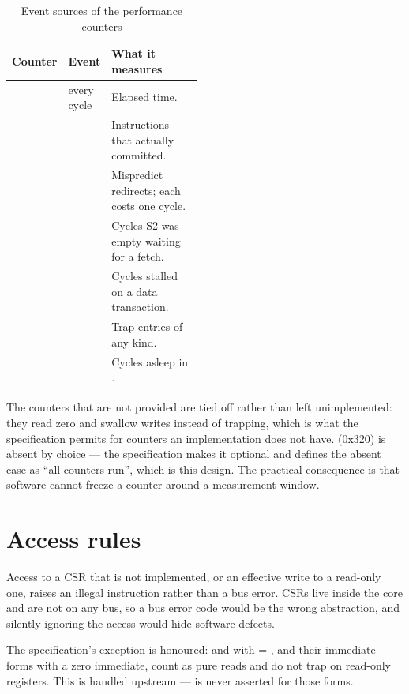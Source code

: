 \begin{table}[H]
\centering
\caption{Event sources of the performance counters}
\label{tab:hpm}
\begin{tabular}{@{}llL{0.48\linewidth}@{}}
\toprule
\textbf{Counter} & \textbf{Event} & \textbf{What it measures} \\
\midrule
{}       & every cycle & Elapsed time. \\
     &  & Instructions that actually committed. \\
 &  & Mispredict redirects; each costs one cycle. \\
 &  & Cycles S2 was empty waiting for a fetch. \\
 &  & Cycles stalled on a data transaction. \\
 &  & Trap entries of any kind. \\
 &  & Cycles asleep in . \\
\bottomrule
\end{tabular}
\end{table}

The counters that are not provided are tied off rather than left unimplemented:
they read zero and swallow writes instead of trapping, which is what the
specification permits for counters an implementation does not have.
 (0x320) is absent by choice --- the specification makes it
optional and defines the absent case as ``all counters run'', which is this
design. The practical consequence is that software cannot freeze a counter around
a measurement window.

\section{Access rules}

Access to a CSR that is not implemented, or an effective write to a read-only
one, raises an illegal instruction rather than a bus error. CSRs live inside the
core and are not on any bus, so a bus error code would be the wrong abstraction,
and silently ignoring the access would hide software defects.

The specification's exception is honoured:  and  with
 = , and their immediate forms with a zero immediate, count as
pure reads and do not trap on read-only registers. This is handled upstream ---
 is never asserted for those forms.

